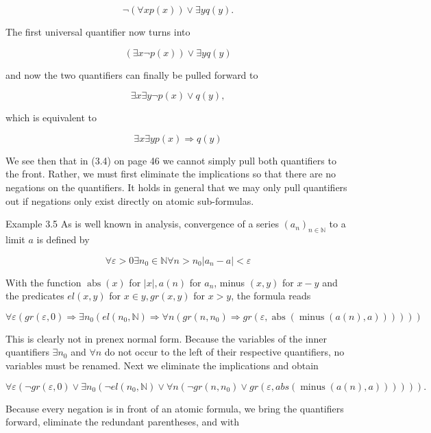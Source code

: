 \documentclass[10pt]{book}
\begin{document}
$$
\neg(\forall x p(x)) \vee \exists y q(y) .
$$

The first universal quantifier now turns into

$$
(\exists x \neg p(x)) \vee \exists y q(y)
$$

and now the two quantifiers can finally be pulled forward to

$$
\exists x \exists y \neg p(x) \vee q(y),
$$

which is equivalent to

$$
\exists x \exists y p(x) \Rightarrow q(y)
$$

We see then that in (3.4) on page 46 we cannot simply pull both quantifiers to the front. Rather, we must first eliminate the implications so that there are no negations on the quantifiers. It holds in general that we may only pull quantifiers out if negations only exist directly on atomic sub-formulas.

Example 3.5 As is well known in analysis, convergence of a series $\left(a_{n}\right)_{n \in \mathbb{N}}$ to a limit $a$ is defined by

$$
\forall \varepsilon>0 \exists n_{0} \in \mathbb{N} \forall n>n_{0}\left|a_{n}-a\right|<\varepsilon
$$

With the function $\operatorname{abs}(x)$ for $|x|, a(n)$ for $a_{n}$, minus $(x, y)$ for $x-y$ and the predicates $e l(x, y)$ for $x \in y, g r(x, y)$ for $x>y$, the formula reads


\begin{equation*}
\forall \varepsilon\left(g r(\varepsilon, 0) \Rightarrow \exists n_{0}\left(e l\left(n_{0}, \mathbb{N}\right) \Rightarrow \forall n\left(g r\left(n, n_{0}\right) \Rightarrow g r(\varepsilon, \operatorname{abs}(\operatorname{minus}(a(n), a)))\right)\right)\right) \tag{3.5}
\end{equation*}


This is clearly not in prenex normal form. Because the variables of the inner quantifiers $\exists n_{0}$ and $\forall n$ do not occur to the left of their respective quantifiers, no variables must be renamed. Next we eliminate the implications and obtain

$$
\forall \varepsilon\left(\neg g r(\varepsilon, 0) \vee \exists n_{0}\left(\neg e l\left(n_{0}, \mathbb{N}\right) \vee \forall n\left(\neg g r\left(n, n_{0}\right) \vee g r(\varepsilon, a b s(\operatorname{minus}(a(n), a)))\right)\right)\right) .
$$

Because every negation is in front of an atomic formula, we bring the quantifiers forward, eliminate the redundant parentheses, and with
\end{document}
